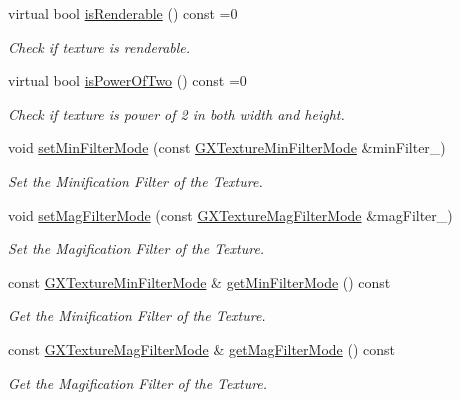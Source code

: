 \begin{DoxyCompactItemize}
virtual bool \hyperlink{class_i_dream_sky_1_1_texture_base_a86cf7152863c1e16be43cc064a257345}{is\+Renderable} () const  =0
\begin{DoxyCompactList}\small\item\em Check if texture is renderable. \end{DoxyCompactList}\item 
virtual bool \hyperlink{class_i_dream_sky_1_1_texture_base_a0b5402cc6c0ade08b13ad32c5304e0ca}{is\+Power\+Of\+Two} () const  =0
\begin{DoxyCompactList}\small\item\em Check if texture is power of 2 in both width and height. \end{DoxyCompactList}\item 
void \hyperlink{class_i_dream_sky_1_1_texture_base_a8aa04ad5a3fa29add142a66d46845655}{set\+Min\+Filter\+Mode} (const \hyperlink{class_i_dream_sky_1_1_g_x_texture_min_filter_mode}{G\+X\+Texture\+Min\+Filter\+Mode} \&min\+Filter\+\_\+)
\begin{DoxyCompactList}\small\item\em Set the Minification Filter of the Texture. \end{DoxyCompactList}\item 
void \hyperlink{class_i_dream_sky_1_1_texture_base_a9ee607111c487e04b9eed86e3d17c214}{set\+Mag\+Filter\+Mode} (const \hyperlink{class_i_dream_sky_1_1_g_x_texture_mag_filter_mode}{G\+X\+Texture\+Mag\+Filter\+Mode} \&mag\+Filter\+\_\+)
\begin{DoxyCompactList}\small\item\em Set the Magification Filter of the Texture. \end{DoxyCompactList}\item 
const \hyperlink{class_i_dream_sky_1_1_g_x_texture_min_filter_mode}{G\+X\+Texture\+Min\+Filter\+Mode} \& \hyperlink{class_i_dream_sky_1_1_texture_base_a6f0c58f9dc21de5f403fa1690e30d897}{get\+Min\+Filter\+Mode} () const 
\begin{DoxyCompactList}\small\item\em Get the Minification Filter of the Texture. \end{DoxyCompactList}\item 
const \hyperlink{class_i_dream_sky_1_1_g_x_texture_mag_filter_mode}{G\+X\+Texture\+Mag\+Filter\+Mode} \& \hyperlink{class_i_dream_sky_1_1_texture_base_a468a5b6087e37705a6483fdead526985}{get\+Mag\+Filter\+Mode} () const 
\begin{DoxyCompactList}\small\item\em Get the Magification Filter of the Texture. \end{DoxyCompactList}\item 

\end{DoxyCompactItemize}
